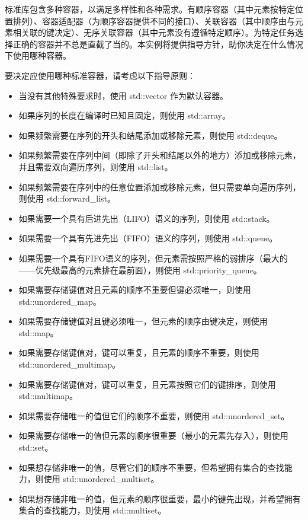 
标准库包含多种容器，以满足多样性和各种需求。有顺序容器（其中元素按特定位置排列）、容器适配器（为顺序容器提供不同的接口）、关联容器（其中顺序由与元素相关联的键决定）、无序关联容器（其中元素没有遵循特定顺序）。为特定任务选择正确的容器并不总是直截了当的。本实例将提供指导方针，助你决定在什么情况下使用哪种容器。


要决定应使用哪种标准容器，请考虑以下指导原则：

\begin{itemize}
\item
当没有其他特殊要求时，使用 std::vector 作为默认容器。

\item
如果序列的长度在编译时已知且固定，则使用 std::array。

\item
如果频繁需要在序列的开头和结尾添加或移除元素，则使用 std::deque。

\item
如果频繁需要在序列中间（即除了开头和结尾以外的地方）添加或移除元素，并且需要双向遍历序列，则使用 std::list。

\item
如果频繁需要在序列中的任意位置添加或移除元素，但只需要单向遍历序列，则使用 std::forward\_list。

\item
如果需要一个具有后进先出（LIFO）语义的序列，则使用 std::stack。

\item
如果需要一个具有先进先出（FIFO）语义的序列，则使用 std::queue。

\item
如果需要一个具有FIFO语义的序列，但元素需按照严格的弱排序（最大的——优先级最高的元素排在最前面），则使用 std::priority\_queue。

\item
如果需要存储键值对且元素的顺序不重要但键必须唯一，则使用 std::unordered\_map。

\item
如果需要存储键值对且键必须唯一，但元素的顺序由键决定，则使用 std::map。

\item
如果需要存储键值对，键可以重复，且元素的顺序不重要，则使用 std::unordered\_multimap。

\item
如果需要存储键值对，键可以重复，且元素按照它们的键排序，则使用 std::multimap。

\item
如果需要存储唯一的值但它们的顺序不重要，则使用 std::unordered\_set。

\item
如果需要存储唯一的值但元素的顺序很重要（最小的元素先存入），则使用 std::set。

\item
如果想存储非唯一的值，尽管它们的顺序不重要，但希望拥有集合的查找能力，则使用 std::unordered\_multiset。

\item
如果想存储非唯一的值，但元素的顺序很重要，最小的键先出现，并希望拥有集合的查找能力，则使用 std::multiset。
\end{itemize}

